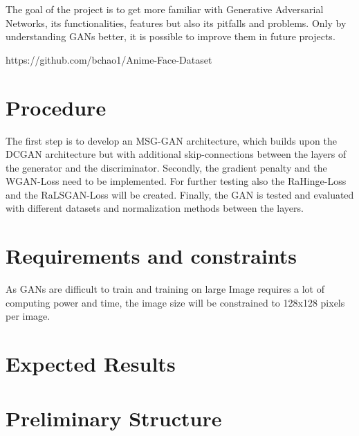 \documentclass[conference,onecolumn,compsoc]{IEEEtran}
\begin{document}
\noindent
The goal of the project is to get more familiar with Generative Adversarial Networks, its functionalities, features but also its pitfalls and problems. Only by understanding GANs better, it is possible to improve them in future projects.

https://github.com/bchao1/Anime-Face-Dataset


\section{Procedure}

\noindent
The first step is to develop an MSG-GAN \cite{karnewar2020msggan} architecture, which builds upon the DCGAN \cite{radford2016unsupervised} architecture but with additional skip-connections between the layers of the generator and the discriminator. Secondly, the gradient penalty and the WGAN-Loss need to be implemented. For further testing also the RaHinge-Loss and the RaLSGAN-Loss will be created. Finally, the GAN is tested and evaluated with different datasets and normalization methods between the layers.

\section{Requirements and constraints}

\noindent
As GANs are difficult to train and training on large Image requires a lot of computing power and time, the image size will be constrained to 128x128 pixels per image.

\section{Expected Results}

\noindent
\blindtext


\section{Preliminary  Structure}
\end{document}
